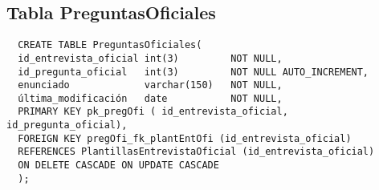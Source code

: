 \subsection{Tabla PreguntasOficiales}

\begin{verbatim}
  CREATE TABLE PreguntasOficiales(
  id_entrevista_oficial int(3)         NOT NULL,
  id_pregunta_oficial   int(3)         NOT NULL AUTO_INCREMENT,
  enunciado             varchar(150)   NOT NULL,
  última_modificación   date           NOT NULL,
  PRIMARY KEY pk_pregOfi ( id_entrevista_oficial, id_pregunta_oficial),
  FOREIGN KEY pregOfi_fk_plantEntOfi (id_entrevista_oficial)
  REFERENCES PlantillasEntrevistaOficial (id_entrevista_oficial)
  ON DELETE CASCADE ON UPDATE CASCADE
  );
\end{verbatim}